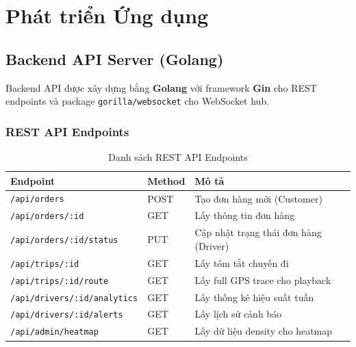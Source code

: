 \section{Phát triển Ứng dụng}
\label{sec:application-development}

\subsection{Backend API Server (Golang)}
\label{sec:backend-api}

Backend API được xây dựng bằng \textbf{Golang} với framework \textbf{Gin} cho REST endpoints và package \texttt{gorilla/websocket} cho WebSocket hub.

\subsubsection{REST API Endpoints}
\bigskip
\begin{table}[H]
\centering
\caption[Các REST API Endpoints chính]{Danh sách REST API Endpoints}
\label{tab:rest-api}
\begin{tabular}{|p{3cm}|p{2.5cm}|p{6cm}|}
\hline
\textbf{Endpoint} & \textbf{Method} & \textbf{Mô tả} \\
\hline
\texttt{/api/orders} & POST & Tạo đơn hàng mới (Customer) \\
\hline
\texttt{/api/orders/:id} & GET & Lấy thông tin đơn hàng \\
\hline
\texttt{/api/orders/:id/status} & PUT & Cập nhật trạng thái đơn hàng (Driver) \\
\hline
\texttt{/api/trips/:id} & GET & Lấy tóm tắt chuyến đi \\
\hline
\texttt{/api/trips/:id/route} & GET & Lấy full GPS trace cho playback \\
\hline
\texttt{/api/drivers/:id/analytics} & GET & Lấy thống kê hiệu suất tuần \\
\hline
\texttt{/api/drivers/:id/alerts} & GET & Lấy lịch sử cảnh báo \\
\hline
\texttt{/api/admin/heatmap} & GET & Lấy dữ liệu density cho heatmap \\
\hline
\end{tabular}
\end{table}


